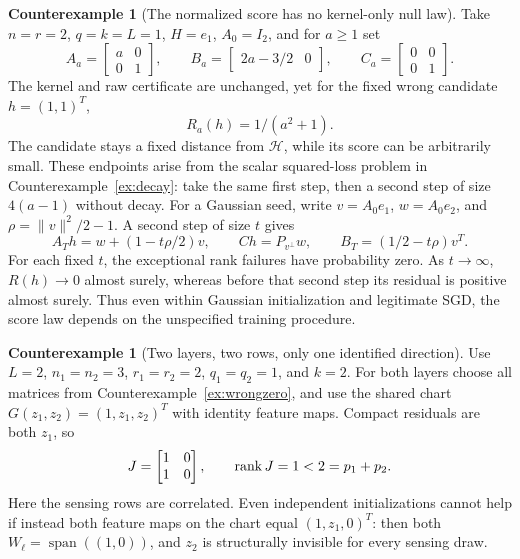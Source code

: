 \documentclass[11pt,a4paper]{article}
\theoremstyle{definition}
\theoremstyle{definition}
\newtheorem{example}[theorem]{Counterexample}
\theoremstyle{remark}\newtheorem{remark}[theorem]{Remark}
\newcommand{\HH}{\mathcal H}\newcommand{\XX}{\mathcal X}\newcommand{\col}{\operatorname{col}}
\begin{document}
\begin{example}[The normalized score has no kernel-only null law]\label{ex:Rlaw}
Take $n=r=2$, $q=k=L=1$, $H=e_1$, $A_0=I_2$, and for $a\ge1$ set
\[
A_a=\begin{bmatrix}a&0\\0&1\end{bmatrix},\qquad
B_a=\begin{bmatrix}2a-3/2&0\end{bmatrix},\qquad
C_a=\begin{bmatrix}0&0\\0&1\end{bmatrix}.
\]
The kernel and raw certificate are unchanged, yet for the fixed wrong candidate $h=(1,1)^T$,
\[
R_a(h)=1/(a^2+1).
\]
The candidate stays a fixed distance from $\HH$, while its score can be arbitrarily small. These endpoints arise from the scalar squared-loss problem in Counterexample~\ref{ex:decay}: take the same first step, then a second step of size $4(a-1)$ without decay. For a Gaussian seed, write $v=A_0e_1$, $w=A_0e_2$, and $\rho=\|v\|^2/2-1$. A second step of size $t$ gives
\[
A_Th=w+(1-t\rho/2)v,\qquad
Ch=P_{v^\perp}w,\qquad B_T=(1/2-t\rho)v^T.
\]
For each fixed $t$, the exceptional rank failures have probability zero. As $t\to\infty$, $R(h)\to0$ almost surely, whereas before that second step its residual is positive almost surely. Thus even within Gaussian initialization and legitimate SGD, the score law depends on the unspecified training procedure.
\end{example}

\begin{example}[Two layers, two rows, only one identified direction]\label{ex:redundant}
Use $L=2$, $n_1=n_2=3$, $r_1=r_2=2$, $q_1=q_2=1$, and $k=2$. For both layers choose all matrices from Counterexample~\ref{ex:wrongzero}, and use the shared chart $G(z_1,z_2)=(1,z_1,z_2)^T$ with identity feature maps. Compact residuals are both $z_1$, so
\[
J=\begin{bmatrix}1&0\\1&0\end{bmatrix},\qquad \operatorname{rank} J=1<2=p_1+p_2.
\]
Here the sensing rows are correlated. Even independent initializations cannot help if instead both feature maps on the chart equal $(1,z_1,0)^T$: then both $W_\ell=\operatorname{span}((1,0))$, and $z_2$ is structurally invisible for every sensing draw.
\end{example}
\end{document}
